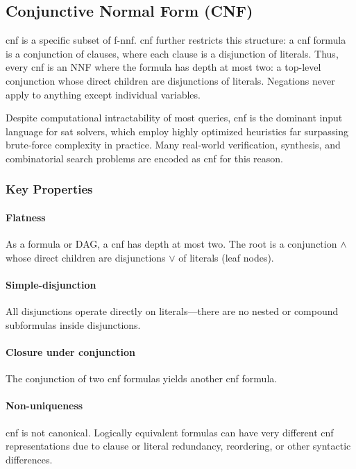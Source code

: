 \subsection{Conjunctive Normal Form (CNF)}
\acrfull{cnf} is a specific subset of \acrshort{f-nnf}. \acrshort{cnf} further restricts this structure: a \acrshort{cnf} formula is a conjunction of clauses, where each clause is a disjunction of literals. Thus, every \acrshort{cnf} is an NNF where the formula has depth at most two: a top-level conjunction whose direct children are disjunctions of literals. Negations never apply to anything except individual variables.

Despite computational intractability of most queries, \acrshort{cnf} is the dominant input language for \acrshort{sat} solvers, which employ highly optimized heuristics far surpassing brute-force complexity in practice. Many real-world verification, synthesis, and combinatorial search problems are encoded as \acrshort{cnf} for this reason.

\subsubsection{Key Properties}

\paragraph{Flatness}
As a formula or DAG, a \acrshort{cnf} has depth at most two. The root is a conjunction $\wedge$ whose direct children are disjunctions $\vee$ of literals (leaf nodes).

\paragraph{Simple-disjunction}
All disjunctions operate directly on literals—there are no nested or compound subformulas inside disjunctions.

\paragraph{Closure under conjunction}
The conjunction of two \acrshort{cnf} formulas yields another \acrshort{cnf} formula.

\paragraph{Non-uniqueness}
\acrshort{cnf} is not canonical. Logically equivalent formulas can have very different \acrshort{cnf} representations due to clause or literal redundancy, reordering, or other syntactic differences.

